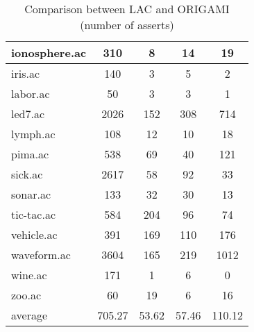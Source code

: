 \begin{table}[htbp]
\begin{tabular}{|l|c|c|c|c|}
		\hline
		ionosphere.ac   & 310           & 8                  & 14                       & 19                            \\
		\hline
		iris.ac         & 140           & 3                  & 5                        & 2                             \\
		\hline
		labor.ac        & 50            & 3                  & 3                        & 1                             \\
		\hline
		led7.ac         & 2026          & 152                & 308                      & 714                           \\
		\hline
		lymph.ac        & 108           & 12                 & 10                       & 18                            \\
		\hline
		pima.ac         & 538           & 69                 & 40                       & 121                           \\
		\hline
		sick.ac         & 2617          & 58                 & 92                       & 33                            \\
		\hline
		sonar.ac        & 133           & 32                 & 30                       & 13                            \\
		\hline
		tic-tac.ac      & 584           & 204                & 96                       & 74                            \\
		\hline
		vehicle.ac      & 391           & 169                & 110                      & 176                           \\
		\hline
		waveform.ac     & 3604          & 165                & 219                      & 1012                          \\
		\hline
		wine.ac         & 171           & 1                  & 6                        & 0                             \\
		\hline
		zoo.ac          & 60            & 19                 & 6                        & 16                            \\
		\hline
		average         & 705.27        & 53.62              & 57.46                    & 110.12                        \\
		\hline
		\end{tabular}
	\caption{Comparison between LAC and ORIGAMI (number of asserts)}
	\label{tab:comparison_lac_origami}
\end{table}